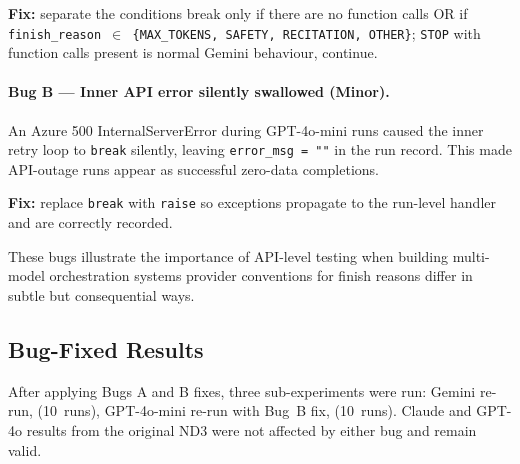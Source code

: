 \textbf{Fix:} separate the conditions break only if there are no function calls OR if \texttt{finish\_reason $\in$ \{MAX\_TOKENS, SAFETY, RECITATION, OTHER\}}; \texttt{STOP} with function calls present is normal Gemini behaviour, continue.

\paragraph{Bug B --- Inner API error silently swallowed (Minor).}
An Azure 500 InternalServerError during GPT-4o-mini runs caused the inner retry loop to \texttt{break} silently, leaving \texttt{error\_msg = ""} in the run record.  
This made API-outage runs appear as successful zero-data completions.

\textbf{Fix:} replace \texttt{break} with \texttt{raise} so exceptions propagate to the
run-level handler and are correctly recorded.

These bugs illustrate the importance of API-level testing when building multi-model orchestration systems provider conventions for finish reasons differ in subtle but consequential ways.

\subsection{Bug-Fixed Results}
\label{sec:ch4_nd3b}

After applying Bugs A and B fixes, three sub-experiments were run: Gemini re-run,
(10~runs), GPT-4o-mini re-run with Bug~B fix, (10~runs).  
Claude and GPT-4o results from the original ND3 were not affected by either bug and remain valid.

